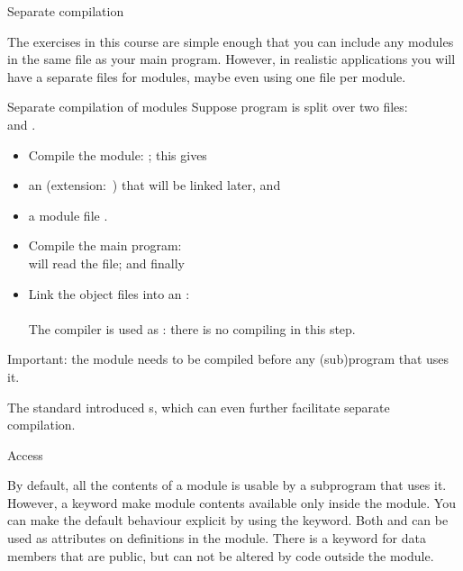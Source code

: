  {Separate compilation}

The exercises in this course are simple enough that you can
include any modules in the same file as your main program.
However, in realistic applications you will have
a separate files for modules, maybe even using one file per module.

\begin{block}{Separate compilation of modules}
  \label{sl:fcompile-mods}
  Suppose program is split over two files:\\
   and .
  \begin{itemize}
  \item Compile the module: ; this gives
  \item an  (extension:~)
    that will be linked later, and
  \item a module file .
  \item Compile the main program:\\
     will read the  file; and finally
  \item Link the object files into an :\\
    \\
    The compiler is used as : there is no compiling
    in this step.
  \end{itemize}
  Important: the module needs to be compiled before any (sub)program
  that uses it.
\end{block}

The  standard introduced s,
which can even further facilitate separate compilation.

 {Access}

By default, all the contents of a module is usable by a subprogram
that uses it. However, a keyword  make module
contents available only inside the module.
You can make the default behaviour explicit by using the
 keyword. Both  and  can be used as
attributes on definitions in the module.
There is a keyword  for data members that
are public, but can not be altered by code outside the module.

\begin{multicols}{2}
\end{multicols}

